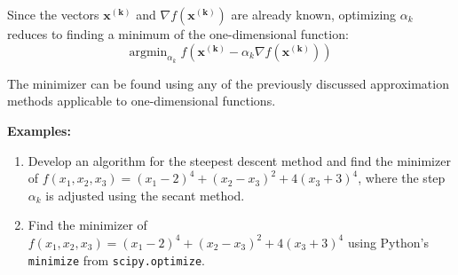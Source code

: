 \documentclass[11pt]{article}
\begin{document}
Since the vectors \(\pmb{x^{(k)}}\) and \(\nabla f(\pmb{x^{(k)}})\) are
already known, optimizing \(\alpha_k\) reduces to finding a minimum of
the one-dimensional function:
\[\text{argmin}_{\alpha_k} \; f(\pmb{x^{(k)}} - \alpha_k \nabla f(\pmb{x^{(k)}}))\]

The minimizer can be found using any of the previously discussed
approximation methods applicable to one-dimensional functions.

\textbf{Examples:}

\begin{enumerate}
\def\labelenumi{\arabic{enumi}.}
\item
  Develop an algorithm for the steepest descent method and find the
  minimizer of
  \(f(x_1, x_2, x_3) = (x_1 - 2)^4 + (x_2 - x_3)^2 + 4(x_3 + 3)^4\),
  where the step \(\alpha_k\) is adjusted using the secant method.
\item
  Find the minimizer of
  \(f(x_1, x_2, x_3) = (x_1 - 2)^4 + (x_2 - x_3)^2 + 4(x_3 + 3)^4\)
  using Python's \texttt{minimize} from \texttt{scipy.optimize}.
\end{enumerate}
\end{document}
